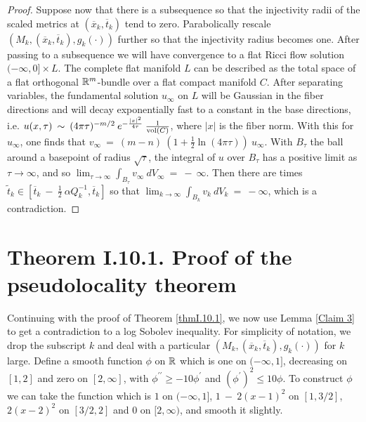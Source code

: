 \begin{proof}
Suppose now that there is a subsequence so that
the injectivity radii of the scaled metrics
at $(\overline{x}_k, \overline{t}_k)$ tend to zero.
Parabolically rescale $(M_k,(\overline{x}_k, \overline{t}_k), g_k(\cdot))$
further so that the injectivity radius becomes one. After passing to a
subsequence we will have convergence to a flat Ricci flow solution
$(-\infty, 0] \times L$. The complete
flat manifold $L$ can be described as the total space of a flat
orthogonal
${\mathbb R}^m$-bundle over a flat compact manifold $C$. After separating
variables, the
fundamental solution $u_\infty$ on $L$ will be Gaussian in the fiber directions and will
decay exponentially fast to a constant in the base directions, i.e.
$u(x, \tau) \: \sim \: (4\pi \tau)^{-m/2} \: e^{- \frac{|x|^2}{4\tau}} \:
\frac{1}{\operatorname{vol}(C)}$, where $|x|$ is the fiber norm. With this for $u_\infty$,
one finds that
$v_\infty \: = \: (m - n) \: \left( 1 + \frac12 \ln(4 \pi \tau) \right) \: u_\infty$.
With $B_\tau$ the ball around a basepoint
of radius $\sqrt{\tau}$, the integral of $u$ over
$B_\tau$ has a positive limit as $\tau \rightarrow \infty$, and so
$\lim_{\tau \rightarrow \infty} \int_{B_\tau} v_\infty \: dV_\infty \: = \: - \: \infty$.
Then there are times $\widetilde{t}_k
\in [\overline{t}_k \: - \: \frac12 \: \alpha Q_k^{-1}, \overline{t}_k]$ so that
$\lim_{k \rightarrow \infty}
\int_{B_k} v_k \: dV_k \: = \: - \infty$, which is a contradiction.
\end{proof}

\section{Theorem I.10.1. Proof of the pseudolocality theorem} \label{pfI.10.1}

Continuing with the proof of Theorem \ref{thmI.10.1}, we now use
Lemma \ref{Claim 3} to get a contradiction to a log Sobolev inequality.
For simplicity of notation, we drop the subscript $k$ and deal with a
particular $(M_k, (\overline{x}_k, \overline{t}_k), g_k(\cdot))$ for
$k$ large.
Define a smooth function $\phi$ on ${\mathbb R}$ which is
one on $(- \infty, 1]$, decreasing on $[1,2]$ and zero on $[2, \infty]$,
with $\phi^{\prime \prime} \ge  - 10 \phi^\prime$ and
$(\phi^\prime)^2 \le 10 \phi$. To construct $\phi$ we can
take the function which is $1$ on $(-\infty, 1]$,
$1 \: - \: 2(x-1)^2$ on $[1, 3/2]$, $2(x-2)^2$ on $[3/2, 2]$ and
$0$ on $[2, \infty)$, and
smooth it slightly.

